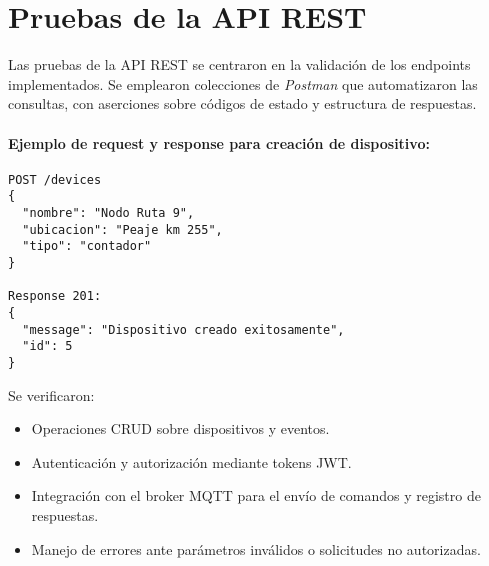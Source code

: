 \section{Pruebas de la API REST}
\label{sec:pruebas-api}

Las pruebas de la API REST se centraron en la validación de los endpoints implementados. 
Se emplearon colecciones de \textit{Postman} que automatizaron las consultas, con aserciones sobre códigos de estado y estructura de respuestas.  


\paragraph{Ejemplo de request y response para creación de dispositivo:}
\begin{verbatim}
POST /devices
{
  "nombre": "Nodo Ruta 9",
  "ubicacion": "Peaje km 255",
  "tipo": "contador"
}

Response 201:
{
  "message": "Dispositivo creado exitosamente",
  "id": 5
}
\end{verbatim}

Se verificaron:  
\begin{itemize}
    \item Operaciones CRUD sobre dispositivos y eventos.
    \item Autenticación y autorización mediante tokens JWT.
    \item Integración con el broker MQTT para el envío de comandos y registro de respuestas.
    \item Manejo de errores ante parámetros inválidos o solicitudes no autorizadas.
\end{itemize}


